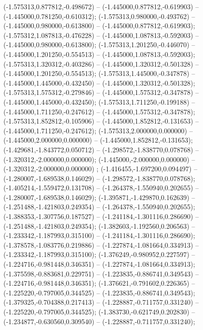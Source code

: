  (-1.575313,0.877812,-0.498672) -- (-1.445000,0.877812,-0.619903) -- (-1.445000,0.781250,-0.610312);
 (-1.575313,0.980000,-0.493762) -- (-1.445000,0.980000,-0.613800) -- (-1.445000,0.877812,-0.619903);
 (-1.575312,1.087813,-0.476228) -- (-1.445000,1.087813,-0.592003) -- (-1.445000,0.980000,-0.613800);
 (-1.575313,1.201250,-0.446070) -- (-1.445000,1.201250,-0.554513) -- (-1.445000,1.087813,-0.592003);
 (-1.575313,1.320312,-0.403286) -- (-1.445000,1.320312,-0.501328) -- (-1.445000,1.201250,-0.554513);
 (-1.575313,1.445000,-0.347878) -- (-1.445000,1.445000,-0.432450) -- (-1.445000,1.320312,-0.501328);
 (-1.575313,1.575312,-0.279846) -- (-1.445000,1.575312,-0.347878) -- (-1.445000,1.445000,-0.432450);
 (-1.575313,1.711250,-0.199188) -- (-1.445000,1.711250,-0.247612) -- (-1.445000,1.575312,-0.347878);
 (-1.575313,1.852812,-0.105906) -- (-1.445000,1.852812,-0.131653) -- (-1.445000,1.711250,-0.247612);
 (-1.575313,2.000000,0.000000) -- (-1.445000,2.000000,0.000000) -- (-1.445000,1.852812,-0.131653);
 (-1.429681,-1.843772,0.050712) -- (-1.298572,-1.838770,0.078768) -- (-1.320312,-2.000000,0.000000);
 (-1.445000,-2.000000,0.000000) -- (-1.320312,-2.000000,0.000000) ;
 (-1.416455,-1.697200,0.094497) -- (-1.280007,-1.689538,0.146029) -- (-1.298572,-1.838770,0.078768);
 (-1.405214,-1.559472,0.131708) -- (-1.264378,-1.550940,0.202655) -- (-1.280007,-1.689538,0.146029);
 (-1.395871,-1.429870,0.162639) -- (-1.251488,-1.421803,0.249354) -- (-1.264378,-1.550940,0.202655);
 (-1.388353,-1.307756,0.187527) -- (-1.241184,-1.301116,0.286690) -- (-1.251488,-1.421803,0.249354);
 (-1.382603,-1.192560,0.206563) -- (-1.233342,-1.187993,0.315100) -- (-1.241184,-1.301116,0.286690);
 (-1.378578,-1.083776,0.219886) -- (-1.227874,-1.081664,0.334913) -- (-1.233342,-1.187993,0.315100);
 (-1.376249,-0.980952,0.227597) -- (-1.224716,-0.981448,0.346351) -- (-1.227874,-1.081664,0.334913);
 (-1.375598,-0.883681,0.229751) -- (-1.223835,-0.886741,0.349543) -- (-1.224716,-0.981448,0.346351);
 (-1.376621,-0.791602,0.226365) -- (-1.225220,-0.797005,0.344525) -- (-1.223835,-0.886741,0.349543);
 (-1.379325,-0.704388,0.217413) -- (-1.228887,-0.711757,0.331240) -- (-1.225220,-0.797005,0.344525);
 (-1.383730,-0.621749,0.202830) -- (-1.234877,-0.630560,0.309540) -- (-1.228887,-0.711757,0.331240);
